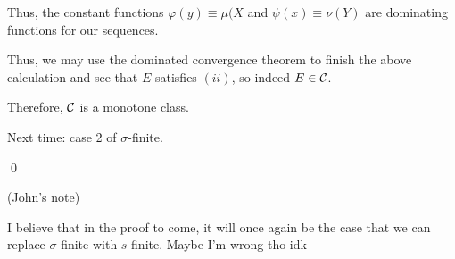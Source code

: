 \documentclass[x11names,reqno,14pt]{extarticle}
\begin{document}
Thus, the constant functions $\varphi(y) \equiv \mu(X$ and $\psi(x) \equiv \nu(Y)$ are dominating functions for our sequences. 

Thus, we may use the dominated convergence theorem to finish the above calculation and see that $E$ satisfies $(ii)$, so indeed $E \in \mathcal{C}$. 

Therefore, $\mathcal{C}$ is a monotone class. 

Next time: case 2 of $\sigma$-finite. 

\qed

\rem (John's note)

I believe that in the proof to come, it will once again be the case that we can replace $\sigma$-finite with $s$-finite. Maybe I'm wrong tho idk
\end{document}
